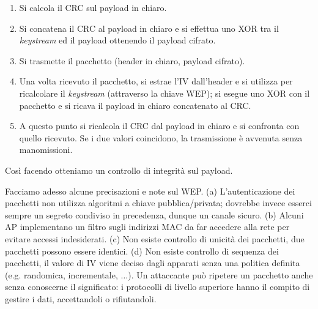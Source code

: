 \begin{enumerate}
	\item Si calcola il CRC sul payload in chiaro.
	\item Si concatena il CRC al payload in chiaro e si effettua uno XOR tra il \textit{keystream} ed il payload ottenendo il payload cifrato.
	\item Si trasmette il pacchetto (header in chiaro, payload cifrato).
	\item Una volta ricevuto il pacchetto, si estrae l'IV dall'header e si utilizza per ricalcolare il \textit{keystream} (attraverso la chiave WEP); si esegue uno XOR con il pacchetto e si ricava il payload in chiaro concatenato al CRC.
	\item A questo punto si ricalcola il CRC dal payload in chiaro e si confronta con quello ricevuto. Se i due valori coincidono, la trasmissione è avvenuta senza manomissioni.
\end{enumerate}
Così facendo otteniamo un controllo di integrità sul payload.

Facciamo adesso alcune precisazioni e note sul WEP. (a) L'autenticazione dei pacchetti non utilizza algoritmi a chiave pubblica/privata; dovrebbe invece esserci sempre un segreto condiviso in precedenza, dunque un canale sicuro. (b) Alcuni AP implementano un filtro sugli indirizzi MAC da far accedere alla rete per evitare accessi indesiderati. (c) Non esiste controllo di unicità dei pacchetti, due pacchetti possono essere identici. (d) Non esiste controllo di sequenza dei pacchetti, il valore di IV viene deciso dagli apparati senza una politica definita (e.g. randomica, incrementale, $\dots$). Un attaccante può ripetere un pacchetto anche senza conoscerne il significato: i protocolli di livello superiore hanno il compito di gestire i dati, accettandoli o rifiutandoli.

